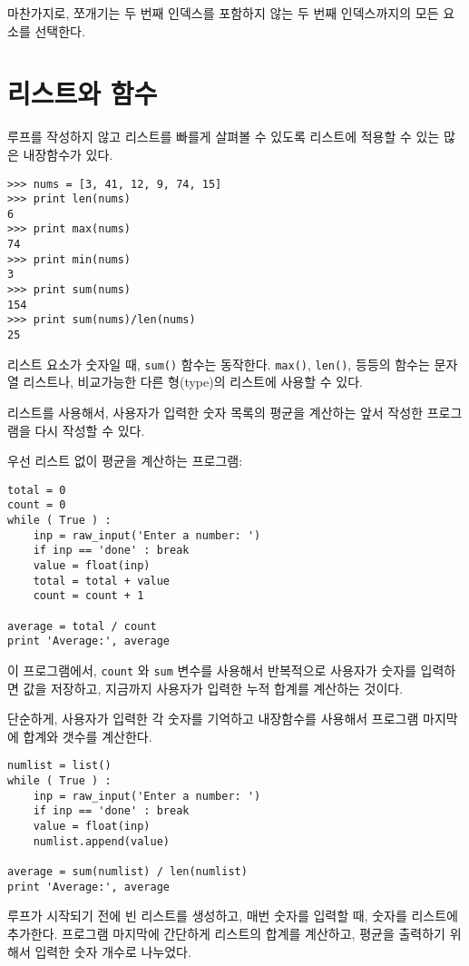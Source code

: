 마찬가지로, 쪼개기는 두 번째 인덱스를 포함하지 않는 두 번째 인덱스까지의 모든 요소를 선택한다.

\section{리스트와 함수}

루프를 작성하지 않고 리스트를 빠를게 살펴볼 수 있도록 리스트에 적용할 수 있는 많은 내장함수가 있다.

\beforeverb
\begin{verbatim}
>>> nums = [3, 41, 12, 9, 74, 15]
>>> print len(nums)
6
>>> print max(nums)
74
>>> print min(nums)
3
>>> print sum(nums)
154
>>> print sum(nums)/len(nums)
25
\end{verbatim}
\afterverb
%

리스트 요소가 숫자일 때, {\tt sum()} 함수는 동작한다. {\tt max()}, {\tt len()}, 등등의 함수는 문자열 리스트나,
 비교가능한 다른 형(type)의 리스트에 사용할 수 있다.

리스트를 사용해서, 사용자가 입력한 숫자 목록의 평균을 계산하는 앞서 작성한 프로그램을 다시 작성할 수 있다.

우선 리스트 없이 평균을 계산하는 프로그램:

\beforeverb
\begin{verbatim}
total = 0
count = 0
while ( True ) :
    inp = raw_input('Enter a number: ')
    if inp == 'done' : break
    value = float(inp)
    total = total + value
    count = count + 1

average = total / count
print 'Average:', average
\end{verbatim}
\afterverb
%
이 프로그램에서, {\tt count} 와 {\tt sum} 변수를 사용해서 반복적으로 사용자가 숫자를 입력하면 값을 저장하고, 
지금까지 사용자가 입력한 누적 합계를 계산하는 것이다.

단순하게, 사용자가 입력한 각 숫자를 기억하고 내장함수를 사용해서 프로그램 마지막에 합계와 갯수를 계산한다.

\beforeverb
\begin{verbatim}
numlist = list()
while ( True ) :
    inp = raw_input('Enter a number: ')
    if inp == 'done' : break
    value = float(inp)
    numlist.append(value)

average = sum(numlist) / len(numlist)
print 'Average:', average
\end{verbatim}
\afterverb
%

루프가 시작되기 전에 빈 리스트를 생성하고, 매번 숫자를 입력할 때, 숫자를 리스트에 추가한다.
프로그램 마지막에 간단하게 리스트의 합계를 계산하고, 평균을 출력하기 위해서 입력한 숫자 개수로 나누었다.

